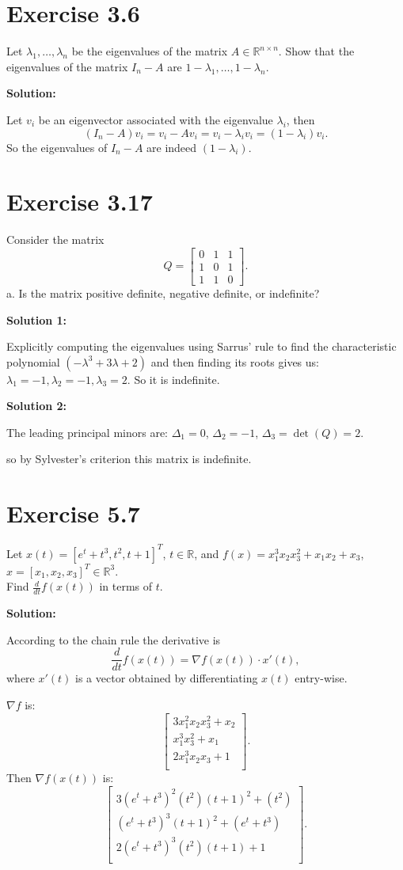 \documentclass{article}
\begin{document}
\section*{Exercise 3.6}
Let $\lambda_1,\dots,\lambda_n$ be the eigenvalues of the matrix $A\in
\mathbb{R}^{n\times n}$. Show that the eigenvalues of the matrix $I_n -A$ are
$1-\lambda_1,\dots,1-\lambda_n$.

\textbf{Solution:}

Let $v_i$ be an eigenvector associated with the eigenvalue $\lambda_i$, then
\[
	(I_n-A)v_i=v_i-Av_i=v_i-\lambda_iv_i=(1-\lambda_i)v_i.
\]
So the eigenvalues of $I_n-A$ are indeed $(1-\lambda_i)$.
\section*{Exercise 3.17}
Consider the matrix
\[ Q=
\begin{bmatrix}
0 & 1 & 1\\	
1 & 0 & 1\\
1 & 1 & 0
\end{bmatrix}.
\]
a. Is the matrix positive definite, negative definite, or indefinite?

\textbf{Solution 1:}

Explicitly computing the eigenvalues using Sarrus' rule to find the characteristic
polynomial $(-\lambda^3+3\lambda+2)$ and then finding its roots gives us:\\
$\lambda_1=-1,\lambda_2=-1,\lambda_3=2$. So it is indefinite.

\textbf{Solution 2:}

The leading principal minors are: $\Delta_1=0$, $\Delta_2=-1$,
$\Delta_3=\det(Q)=2$.

so by Sylvester's criterion this matrix is indefinite.
\section*{Exercise 5.7}
Let $x(t)=[e^t+t^3,t^2,t+1]^T$, $t\in \mathbb{R}$, and $f(x)=x_1^3x_2x_3^2 +
x_1x_2 + x_3$,\\
$x=[x_1,x_2,x_3]^T\in \mathbb{R}^3$.\\
Find $\frac{d}{dt}f(x(t))$ in terms of $t$.

\textbf{Solution:}

According to the chain rule the derivative is
\[
\frac{d}{dt}f(x(t))=\nabla f(x(t))\cdot x'(t),
\]
where $x'(t)$ is a vector obtained by differentiating $x(t)$ entry-wise.

$\nabla f$ is:
\[
\begin{bmatrix}
	3x_1^2x_2x_3^2+x_2\\
	x_1^3x_3^2 + x_1\\
	2x_1^3x_2x_3+1\\
\end{bmatrix}.
\]
Then $\nabla f(x(t))$ is:
\[
\begin{bmatrix}
	3(e^t+t^3)^2(t^2)(t+1)^2+(t^2)\\
	(e^t+t^3)^3(t+1)^2 + (e^t+t^3)\\
	2(e^t+t^3)^3(t^2)(t+1)+1\\
\end{bmatrix}.
\]
\end{document}

